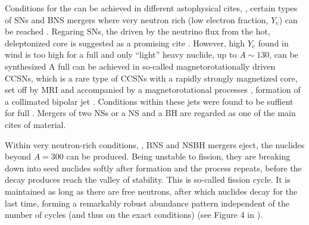 Conditions for the \rproc{} can be achieved in different astophysical cites, \eg, 
certain types of \acp{SN} and \ac{BNS} mergers where very neutron rich (low 
electron fraction, $Y_e$) can be reached
\citep{Mathews:1990,Thielemann:2011,Lippuner:2015gwa,Siegel:2019mlp}. 
Regaring \acp{SN}, the \nwind{} driven by the neutrino flux from the hot, deleptonized
core \citep{Qian:1996xt} is suggested as a promising cite \citep{Woosley:2002,Wanajo:2006mq}.
However, high $Y_e$ found in wind is too high for a full \rproc{} and only ``light'' heavy 
nuclide, up to $A\sim130$, can be synthesized 
\citep{Qian:1996xt,Thompson:2001ys,Fischer:2010,Roberts:2010,MartinezPinedo:2012rb,Wanajo:2013} 
%
A full \rproc{} can be achieved in so-called magnetorotationally driven \acp{CCSN},
which is a rare type of \acp{CCSN} with a rapidly strongly magnetized core, 
set off by \ac{MRI} and accompanied by a magnetorotational processes \eg, formation of a 
collimated bipolar jet 
\citep{Wheeler:2000,Akiyama:2003,Burrows:2007yx,Mosta:2014jaa,Mosta:2015,Siegel:2019mlp}.
Conditions within these jets were found to be suffient for full \rproc{} \nuc{} 
\citep{Winteler:2012,Nishimura:2015nca}.
Mergers of two \acp{NS} or a \ac{NS} and a \ac{BH} are regarded as one of the main cites 
of \rproc{} material.%

Within very neutron-rich conditions, \eg, \ac{BNS} and \ac{NSBH} mergers eject,
the nuclides beyond $A=300$ can be produced. Being unstable to fission, they are
breaking down into seed nuclides softly after formation and the process repeats, 
before the decay produces reach the valley of stability.
This is so-called fission cycle.
It is maintained as long as there are free neutrons, after which nuclides decay 
for the last time, forming a remarkably robust abundance pattern independent of the 
number of cycles (and thus on the exact conditions) 
(see Figure 4 in \citet{Korobkin:2012uy}).

